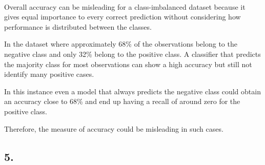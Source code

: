 \documentclass[11pt]{article}
\begin{document}
    \begin{center}
    \end{center}
    { \hspace*{\fill} \\}
    
    Overall accuracy can be misleading for a class-imbalanced dataset
because it gives equal importance to every correct prediction without
considering how performance is distributed between the classes.

In the dataset where approximately 68\% of the observations belong to
the negative class and only 32\% belong to the positive class. A
classifier that predicts the majority class for most observations can
show a high accuracy but still not identify many positive cases.

In this instance even a model that always predicts the negative class
could obtain an accuracy close to 68\% and end up having a recall of
around zero for the positive class.

Therefore, the measure of accuracy could be misleading in such cases.

    \subsection{5.}
\end{document}
